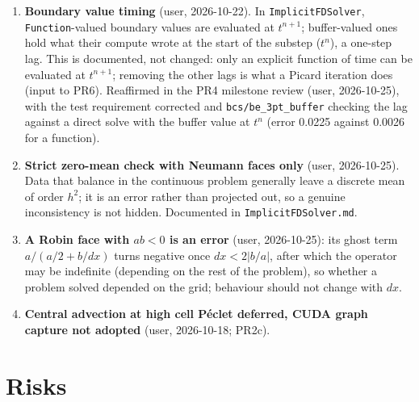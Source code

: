 \documentclass[11pt]{article}
\begin{document}
\begin{enumerate}[leftmargin=*]
iterations with boundary faces 7, 6, 6 at $n = 64, 128, 256$
($l_{tol}=10^{-10}$, CPU) against 9, 9, 9 periodic.
\item \textbf{Boundary value timing} (user, 2026-10-22). In
\texttt{ImplicitFDSolver}, \texttt{Function}-valued boundary values are
evaluated at $t^{n+1}$; buffer-valued ones hold what their compute wrote at
the start of the substep ($t^n$), a one-step lag. This is documented, not
changed: only an explicit function of time can be evaluated at $t^{n+1}$;
removing the other lags is what a Picard iteration does (input to PR6).
Reaffirmed in the PR4 milestone review (user, 2026-10-25), with the test
requirement corrected and \texttt{bcs/be\_3pt\_buffer} checking the lag
against a direct solve with the buffer value at $t^n$ (error 0.0225 against
0.0026 for a function).
\item \textbf{Strict zero-mean check with Neumann faces only} (user,
2026-10-25). Data that balance in the continuous problem generally leave a
discrete mean of order $h^2$; it is an error rather than projected out, so a
genuine inconsistency is not hidden. Documented in \texttt{ImplicitFDSolver.md}.
\item \textbf{A Robin face with $ab < 0$ is an error} (user, 2026-10-25): its
ghost term $a/(a/2 + b/dx)$ turns negative once $dx < 2|b/a|$, after which the
operator may be indefinite (depending on the rest of the problem), so whether a
problem solved depended on the grid; behaviour should not change with $dx$.
\item \textbf{Central advection at high cell P\'eclet deferred, CUDA graph
capture not adopted} (user, 2026-10-18; PR2c).
\end{enumerate}

\section{Risks}
\label{sec:risks}
\end{document}
